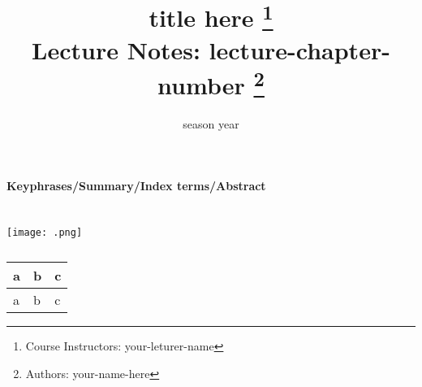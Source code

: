 \documentclass{tufte-handout}
\title[short title]{title here
       \thanks{Course Instructors: your-leturer-name} \\
       \Large Lecture Notes: lecture-chapter-number \thanks{Authors: your-name-here}}
\date{season year}                                %
\begin{document}
\maketitle


\textbf{Keyphrases/Summary/Index terms/Abstract}

\section{}

\begin{marginfigure}%
  \texttt{[image: .png]}
  \caption{}
\end{marginfigure}

\begin{table}[ht]
  \centering
  \selectfont
  \begin{tabular}{lll}
    \toprule
    a & b & c \\
    \midrule
    a & b & c \\
    \bottomrule
  \end{tabular}
  \caption{}
\end{table}
\end{document}
